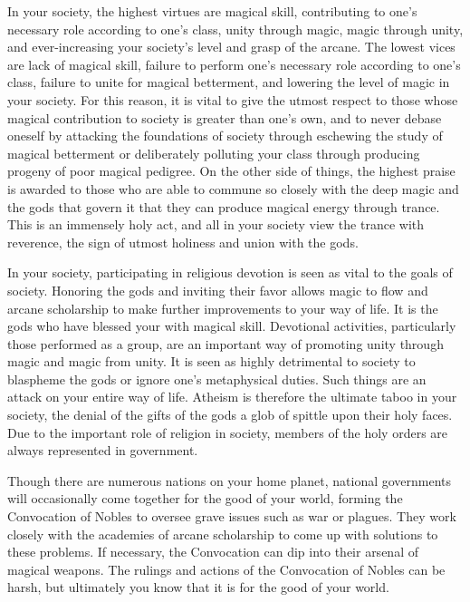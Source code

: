 \documentclass[blue]{guildcamp3}
\begin{document}
In your society, the highest virtues are magical skill, contributing to one's necessary role according to one's class, unity through magic, magic through unity, and ever-increasing your society's level and grasp of the arcane. The lowest vices are lack of magical skill, failure to perform one's necessary role according to one's class, failure to unite for magical betterment, and lowering the level of magic in your society. For this reason, it is vital to give the utmost respect to those whose magical contribution to society is greater than one's own, and to never debase oneself by attacking the foundations of society through eschewing the study of magical betterment or deliberately polluting your class through producing progeny of poor magical pedigree. On the other side of things, the highest praise is awarded to those who are able to commune so closely with the deep magic and the gods that govern it that they can produce magical energy through trance. This is an immensely holy act, and all in your society view the trance with reverence, the sign of utmost holiness and union with the gods.

In your society, participating in religious devotion is seen as vital to the goals of society. Honoring the gods and inviting their favor allows magic to flow and arcane scholarship to make further improvements to your way of life. It is the gods who have blessed your with magical skill. Devotional activities, particularly those performed as a group, are an important way of promoting unity through magic and magic from unity. It is seen as highly detrimental to society to blaspheme the gods or ignore one's metaphysical duties. Such things are an attack on your entire way of life. Atheism is therefore the ultimate taboo in your society, the denial of the gifts of the gods a glob of spittle upon their holy faces. Due to the important role of religion in society, members of the holy orders are always represented in government.

Though there are numerous nations on your home planet, national governments will occasionally come together for the good of your world, forming the Convocation of Nobles to oversee grave issues such as war or plagues. They work closely with the academies of arcane scholarship to come up with solutions to these problems. If necessary, the Convocation can dip into their arsenal of magical weapons. The rulings and actions of the Convocation of Nobles can be harsh, but ultimately you know that it is for the good of your world.
\end{document}
